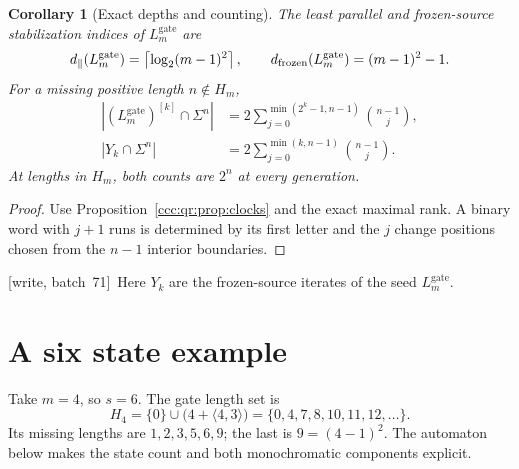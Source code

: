 \documentclass[11pt,letterpaper]{article}
\newtheorem{corollary}[theorem]{Corollary}
\theoremstyle{definition}
\theoremstyle{remark}
\newcommand{\clog}[1]{\left\lceil\log_2 #1\right\rceil}
\newcommand{\wsevone}{\textup{[write, batch~71]}}
\newcommand{\Lgate}[1]{L^{\mathrm{gate}}_{#1}}
\begin{document}
\begin{corollary}[Exact depths and counting]\label{ccc:qr:cor:depth}
The least parallel and frozen-source stabilization indices of $\Lgate m$ are
\[
d_\parallel(\Lgate m)=\clog{(m-1)^2},
\qquad
d_{\rm frozen}(\Lgate m)=(m-1)^2-1.
\]
For a missing positive length $n\notin H_m$,
\begin{align*}
|{(\Lgate m)}^{[k]}\cap\Sigma^n|
 &=2\sum_{j=0}^{\min(2^k-1,n-1)}\binom{n-1}{j},\\
|Y_k\cap\Sigma^n|
 &=2\sum_{j=0}^{\min(k,n-1)}\binom{n-1}{j}.
\end{align*}
At lengths in $H_m$, both counts are $2^n$ at every generation.
\end{corollary}
\begin{proof}
Use Proposition~\ref{ccc:qr:prop:clocks} and the exact maximal rank. A
binary word with $j+1$ runs is determined by its first letter and the $j$
change positions chosen from the $n-1$ interior boundaries.
\end{proof}

\wsevone\ Here $Y_k$ are the frozen-source iterates of the seed $\Lgate m$.

\section{A six state example}\label{ccc:qr:sec:example}

Take $m=4$, so $s=6$. The gate length set is
\[
H_4=\{0\}\cup\bigl(4+\langle4,3\rangle\bigr)
=\{0,4,7,8,10,11,12,\ldots\}.
\]
Its missing lengths are $1,2,3,5,6,9$; the last is $9=(4-1)^2$. The
automaton below makes the state count and both monochromatic components
explicit.

\begin{center}
\end{center}
\end{document}
